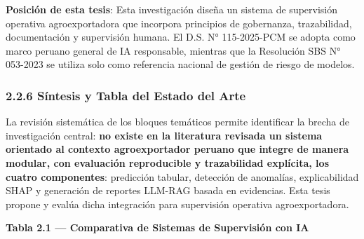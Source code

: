 \textbf{Posición de esta tesis}: Esta investigación diseña un sistema de
supervisión operativa agroexportadora que incorpora principios de
gobernanza, trazabilidad, documentación y supervisión humana. El D.S. N°
115-2025-PCM se adopta como marco peruano general de IA responsable,
mientras que la Resolución SBS N° 053-2023 se utiliza solo como
referencia nacional de gestión de riesgo de modelos.

\subsubsection{2.2.6 Síntesis y Tabla del Estado del
Arte}\label{suxedntesis-y-tabla-del-estado-del-arte}

La revisión sistemática de los bloques temáticos permite identificar la
brecha de investigación central: \textbf{no existe en la literatura
revisada un sistema orientado al contexto agroexportador peruano que
integre de manera modular, con evaluación reproducible y trazabilidad
explícita, los cuatro componentes}: predicción tabular, detección de
anomalías, explicabilidad SHAP y generación de reportes LLM-RAG basada
en evidencias. Esta tesis propone y evalúa dicha integración para
supervisión operativa agroexportadora.

\textbf{Tabla 2.1 --- Comparativa de Sistemas de Supervisión con IA}

